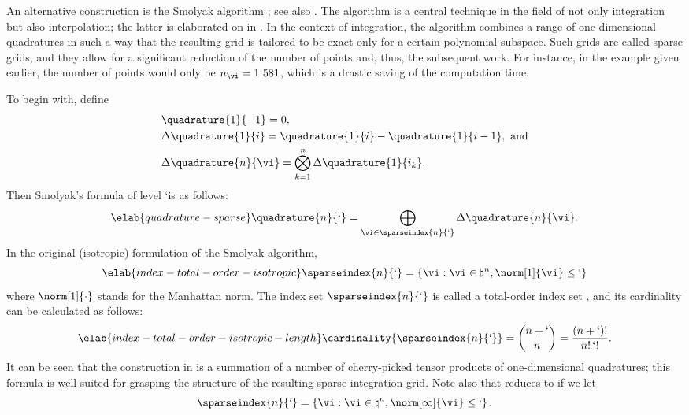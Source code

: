 An alternative construction is the Smolyak algorithm \cite{smolyak1963}; see
also \cite{klimke2006, eldred2008, heiss2008, maitre2010}. The algorithm is a
central technique in the field of not only integration but also interpolation;
the latter is elaborated on in . In the context of
integration, the algorithm combines a range of one-dimensional quadratures in
such a way that the resulting grid is tailored to be exact only for a certain
polynomial subspace. Such grids are called sparse grids, and they allow for a
significant reduction of the number of points and, thus, the subsequent work.
For instance, in the example given earlier, the number of points would only be
$n_{\vi} = 1~581$, which is a drastic saving of the computation time.

To begin with, define
\begin{align*}
  & \quadrature{1}{-1} = 0, \\
  & \Delta\quadrature{1}{i} = \quadrature{1}{i} - \quadrature{1}{i - 1}, \text{ and} \\
  & \Delta\quadrature{n}{\vi} = \bigotimes_{k = 1}^n \Delta\quadrature{1}{i_k}.
\end{align*}
Then Smolyak's formula of level \lq is as follows:
\begin{equation} \elab{quadrature-sparse}
  \quadrature{n}{\lq} = \bigoplus_{\vi \in \sparseindex{n}{\lq}} \Delta\quadrature{n}{\vi}.
\end{equation}
In the original (isotropic) formulation of the Smolyak algorithm,
\begin{equation} \elab{index-total-order-isotropic}
  \sparseindex{n}{\lq} = \left\{ \vi: \vi \in \natural^n, \norm[1]{\vi} \leq \lq \right\}
\end{equation}
where $\norm[1]{\cdot}$ stands for the Manhattan norm. The index set
$\sparseindex{n}{\lq}$ is called a total-order index set \cite{eldred2008,
beck2011}, and its cardinality can be calculated as follows:
\begin{equation} \elab{index-total-order-isotropic-length}
  \cardinality{\sparseindex{n}{\lq}} = {n + \lq \choose n} = \frac{(n + \lq)!}{n! \, \lq!}.
\end{equation}
It can be seen that the construction in  is a summation
of a number of cherry-picked tensor products of one-dimensional quadratures;
this formula is well suited for grasping the structure of the resulting sparse
integration grid. Note also that  reduces to
 if we let
\[
  \sparseindex{n}{\lq} = \left\{ \vi: \vi \in \natural^n, \norm[\infty]{\vi} \leq \lq \right\}.
\]

